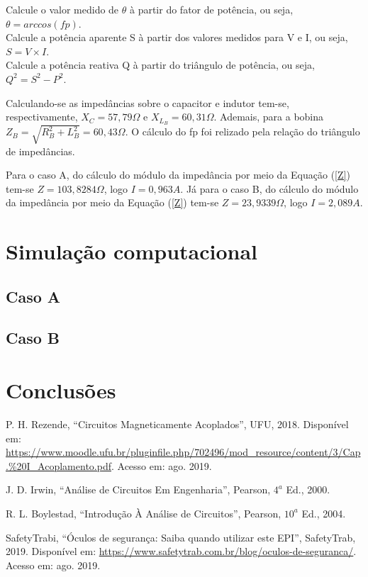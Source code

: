 \documentclass[a4paper,12pt,oneside,openany,table,xcdraw]{article}
\begin{document}
\begin{enumerate}[1 - ]
\noindent\text{[1]} Calcule o valor medido de $\theta$ à partir do fator de potência, ou seja, $\theta = arccos(fp)$. \\
\noindent\text{[2]} Calcule a potência aparente S à partir dos valores medidos para V e I, ou seja, $S=V\times I$. \\
\noindent\text{[3]} Calcule a potência reativa Q à partir do triângulo de potência, ou seja, $Q^2=S^2-P^2$. 

Calculando-se as impedâncias sobre o capacitor e indutor tem-se, respectivamente, $X_{C}=57,79\Omega$ e $X_{L_B}=60,31\Omega$.  Ademais, para a bobina $Z_B=\sqrt{R_B^2+L_B^2}=60,43\Omega$. O cálculo do fp foi relizado pela relação do triângulo de impedâncias.

Para o caso A, do cálculo do módulo da impedância por meio da Equação (\ref{Z}) tem-se $Z=103,8284\Omega$, logo $I=0,963A$.
Já para o caso B, do cálculo do módulo da impedância por meio da Equação (\ref{Z}) tem-se $Z=23,9339\Omega$, logo $I=2,089A$.

\end{enumerate}


\section{Simulação computacional} %

\subsection{Caso A}

\subsection{Caso B}


\section{Conclusões} %


\newpage
\begin{thebibliography}{9} 
    P. H. Rezende,
    “Circuitos Magneticamente Acoplados”, UFU, 2018.
 Disponível em:
 \url{https://www.moodle.ufu.br/pluginfile.php/702496/mod_resource/content/3/Cap.\%20I_Acoplamento.pdf}. Acesso em: ago. 2019.

    J. D. Irwin,
    “Análise de Circuitos Em Engenharia”, Pearson, $4^a$ Ed., 2000.

    R. L. Boylestad,
    “Introdução À Análise de Circuitos”, Pearson, $10^a$ Ed., 2004.

    SafetyTrabi,
    “Óculos de segurança: Saiba quando utilizar este EPI”, SafetyTrab, 2019.
 Disponível em:
 \url{https://www.safetytrab.com.br/blog/oculos-de-seguranca/}. Acesso em: ago. 2019.


\end{thebibliography}
\end{document}
